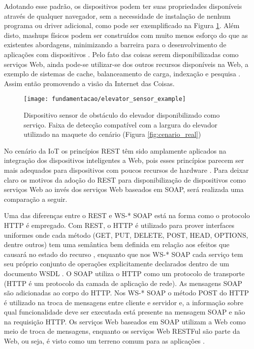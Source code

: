Adotando esse padrão, os dispositivos podem ter suas propriedades disponíveis através de qualquer navegador, sem a necessidade de instalação de nenhum programa ou driver adicional, como pode ser exemplificado na Figura \ref{fig:dispnavegador}. Além disto, mashups físicos\footnotemark {} podem ser construídos com muito menos esforço do que as existentes abordagens, minimizando a barreira para o desenvolvimento de aplicações com dispositivos \cite{Guinard:2009}. Pelo fato das coisas serem disponibilizadas como serviços Web, ainda pode-se utilizar-se dos outros recursos disponíveis na Web, a exemplo de sistemas de cache, balanceamento de carga, indexação e pesquisa \cite{Franca:2011}. Assim então promovendo a visão da Internet das Coisas.

\begin{figure}[!htb] \centering 
  \centering
  \texttt{[image: fundamentacao/elevator\_sensor\_example]} 
  \caption{Dispositivo sensor de obstáculo do elevador disponibilizado como serviço. Faixa de detecção compatível com a largura do elevador utilizado na maquete do cenário (Figura \ref{fig:cenario_real})} 
  \label{fig:dispnavegador}
\end{figure}

No cenário da IoT os princípios REST têm sido amplamente aplicados na integração dos dispositivos inteligentes a Web, pois esses princípios parecem ser mais adequados para dispositivos com poucos recursos de hardware \cite{Franca:2011}. Para deixar claro os motivos da adoção do REST para disponibilização de dispositivos como serviços Web ao invés dos serviços Web baseados em SOAP, será realizada uma comparação a seguir.

Uma das diferenças entre o REST e WS-* SOAP está na forma como o protocolo HTTP é empregado. Com REST, o HTTP é utilizado para prover interfaces uniformes onde cada método (GET, PUT, DELETE, POST, HEAD, OPTIONS, dentre outros) tem uma semântica bem definida em relação aos efeitos que causará no estado do recurso \cite{Franca:2011}, enquanto que nos WS-* SOAP cada serviço tem seu próprio conjunto de operações explicitamente declarados dentro de um documento WSDL \cite{Pautasso:2014}. O SOAP utiliza o HTTP como um protocolo de transporte (HTTP é um protocolo da camada de aplicação de rede). As mensagens SOAP são adicionadas ao corpo do HTTP. Nos WS-* SOAP o método POST do HTTP é utilizado na troca de mensagens entre cliente e servidor e, a informação sobre qual funcionalidade deve ser executada está presente na mensagem SOAP e não na requisição HTTP. Os serviços Web baseados em SOAP utilizam a Web como meio de troca de mensagens, enquanto os serviços Web RESTFul são parte da Web, ou seja, é visto como um terreno comum para as aplicações \cite{Franca:2011}.

